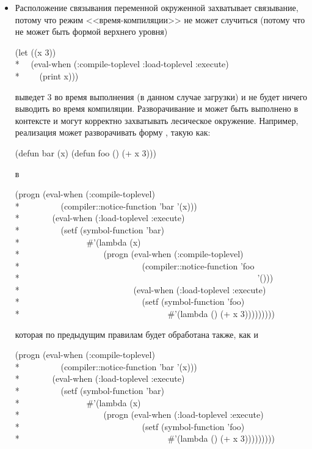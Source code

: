 \begin{newer}
\begin{defspec}
\begin{itemize}
  \item Расположение связывания переменной окруженной 
    захватывает связывание, потому что режим <<время-компиляции>> не может
    случиться (потому что  не может быть формой верхнего уровня)
\begin{lisp}
(let ((x 3)) \\*
~~(eval-when (:compile-toplevel :load-toplevel :execute) \\*
~~~~(print x)))
\end{lisp}
выведет 3 во время выполнения (в данном случае загрузки) и не будет ничего
выводить во время компиляции. Разворачивание  и  может
быть выполнено в контексте  и могут корректно захватывать
лесическое окружение.
Например, реализация может разворачивать форму , такую как:
\begin{lisp}
(defun bar (x) (defun foo () (+ x 3)))
\end{lisp}
в
\begin{lisp}
(progn (eval-when (:compile-toplevel) \\*
~~~~~~~~~(compiler::notice-function 'bar '(x))) \\*
~~~~~~~(eval-when (:load-toplevel :execute) \\*
~~~~~~~~~(setf (symbol-function 'bar) \\*
~~~~~~~~~~~~~~~\#'(lambda (x) \\*
~~~~~~~~~~~~~~~~~~~(progn (eval-when (:compile-toplevel)  \\*
~~~~~~~~~~~~~~~~~~~~~~~~~~~~(compiler::notice-function 'foo \\*
~~~~~~~~~~~~~~~~~~~~~~~~~~~~~~~~~~~~~~~~~~~~~~~~~~~~~~~'())) \\*
~~~~~~~~~~~~~~~~~~~~~~~~~~(eval-when (:load-toplevel :execute) \\*
~~~~~~~~~~~~~~~~~~~~~~~~~~~~(setf (symbol-function 'foo) \\*
~~~~~~~~~~~~~~~~~~~~~~~~~~~~~~~~~~\#'(lambda () (+ x 3)))))))))
\end{lisp}
которая по предыдущим правилам будет обработана также, как и 
\begin{lisp}
(progn (eval-when (:compile-toplevel) \\*
~~~~~~~~~(compiler::notice-function 'bar '(x))) \\*
~~~~~~~(eval-when (:load-toplevel :execute) \\*
~~~~~~~~~(setf (symbol-function 'bar) \\*
~~~~~~~~~~~~~~~\#'(lambda (x) \\*
~~~~~~~~~~~~~~~~~~~(progn (eval-when (:load-toplevel :execute) \\*
~~~~~~~~~~~~~~~~~~~~~~~~~~~~(setf (symbol-function 'foo) \\*
~~~~~~~~~~~~~~~~~~~~~~~~~~~~~~~~~~\#'(lambda () (+ x 3)))))))))
\end{lisp}


\end{itemize}
\end{defspec}
\end{newer}
